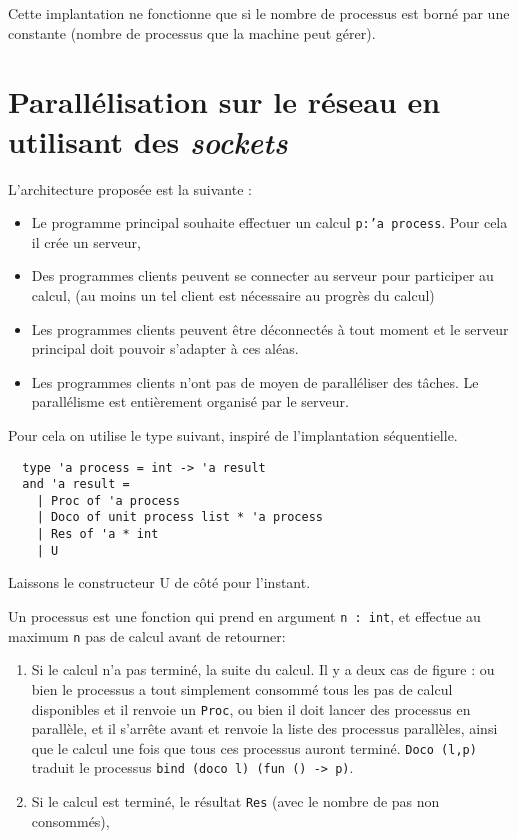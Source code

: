 \documentclass[11pt]{article}
\begin{document}
\smallskip

Cette implantation ne fonctionne que si le nombre de processus est
born\'e par une constante (nombre de processus que la machine peut g\'erer).

\section{Parall\'elisation sur le r\'eseau en utilisant des {\sl sockets}}

L'architecture propos\'ee est la suivante :

\begin{itemize}
  \item Le programme principal souhaite effectuer un calcul
    {\tt p:'a process}. Pour cela il cr\'ee un serveur,
  \item Des programmes clients peuvent se connecter au serveur pour
    participer au calcul,
    (au moins un tel client est n\'ecessaire au progr\`es du calcul)
  \item Les programmes clients peuvent \^etre d\'econnect\'es \`a tout moment
    et le serveur principal doit pouvoir s'adapter \`a ces al\'eas.
  \item Les programmes clients n'ont pas de moyen de parall\'eliser
    des t\^aches. Le parall\'elisme est enti\`erement organis\'e
    par le serveur.
\end{itemize}

Pour cela on utilise le type suivant, inspir\'e de l'implantation
s\'equentielle.

\begin{lstlisting}
  type 'a process = int -> 'a result
  and 'a result =
    | Proc of 'a process
    | Doco of unit process list * 'a process
    | Res of 'a * int
    | U
\end{lstlisting}

Laissons le constructeur U de c\^ot\'e pour l'instant.

Un processus est une fonction qui prend en argument {\tt n : int},
et effectue au maximum {\tt n} pas de calcul avant de retourner:

\begin{enumerate}
  \item Si le calcul n'a pas termin\'e, la suite du calcul.
    Il y a deux cas de figure : ou bien le processus a tout simplement
    consomm\'e tous les pas de calcul disponibles
    et il renvoie un {\tt Proc},
    ou bien il doit lancer des processus en parall\`ele, et il s'arr\^ete
    avant et renvoie la liste des processus parall\`eles,
    ainsi que le calcul une fois que tous ces processus auront termin\'e.
    {\tt Doco (l,p)} traduit le processus
    {\tt bind (doco l) (fun () -> p)}.
  \item Si le calcul est termin\'e, le r\'esultat {\tt Res}
    (avec le nombre de pas non consomm\'es),
\end{enumerate}
\end{document}
